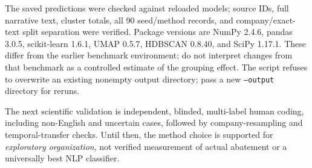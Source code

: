 \documentclass[11pt,a4paper]{article}
\begin{document}
The saved predictions were checked against reloaded models; source IDs,
full narrative text, cluster totals, all 90 seed/method records, and
company/exact-text split separation were verified.
Package versions are NumPy 2.4.6, pandas 3.0.5, scikit-learn 1.6.1,
UMAP 0.5.7, HDBSCAN 0.8.40, and SciPy 1.17.1.
These differ from the earlier benchmark environment; do not interpret
changes from that benchmark as a controlled estimate of the grouping effect.
The script refuses to overwrite an existing nonempty output directory;
pass a new \texttt{--output} directory for reruns.

The next scientific validation is independent, blinded, multi-label human
coding, including non-English and uncertain cases, followed by
company-resampling and temporal-transfer checks. Until then, the method
choice is supported for \emph{exploratory organization}, not verified
measurement of actual abatement or a universally best NLP classifier.
\end{document}
